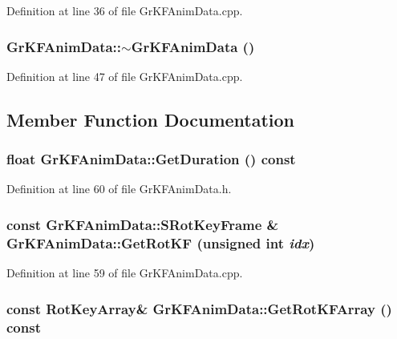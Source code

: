 Definition at line 36 of file GrKFAnimData.cpp.\hypertarget{class_gr_k_f_anim_data_93cd2a5c279af2b5c8718808383e65d9}{
\subsubsection[{$\sim$GrKFAnimData}]{\setlength{\rightskip}{0pt plus 5cm}GrKFAnimData::$\sim$GrKFAnimData ()}}
\label{class_gr_k_f_anim_data_93cd2a5c279af2b5c8718808383e65d9}




Definition at line 47 of file GrKFAnimData.cpp.

\subsection{Member Function Documentation}
\hypertarget{class_gr_k_f_anim_data_e741a43f1dee1899c19991f7e2fbcd7a}{
\subsubsection[{GetDuration}]{\setlength{\rightskip}{0pt plus 5cm}float GrKFAnimData::GetDuration () const}}
\label{class_gr_k_f_anim_data_e741a43f1dee1899c19991f7e2fbcd7a}




Definition at line 60 of file GrKFAnimData.h.\hypertarget{class_gr_k_f_anim_data_f6cfbffb7c637eb8fe5305d36a7f2ebf}{
\subsubsection[{GetRotKF}]{\setlength{\rightskip}{0pt plus 5cm}const {\bf GrKFAnimData::SRotKeyFrame} \& GrKFAnimData::GetRotKF (unsigned int {\em idx})}}
\label{class_gr_k_f_anim_data_f6cfbffb7c637eb8fe5305d36a7f2ebf}




Definition at line 59 of file GrKFAnimData.cpp.\hypertarget{class_gr_k_f_anim_data_47c324fefce09f6f44417a363beefd1f}{
\subsubsection[{GetRotKFArray}]{\setlength{\rightskip}{0pt plus 5cm}const {\bf RotKeyArray}\& GrKFAnimData::GetRotKFArray () const}}
\label{class_gr_k_f_anim_data_47c324fefce09f6f44417a363beefd1f}




